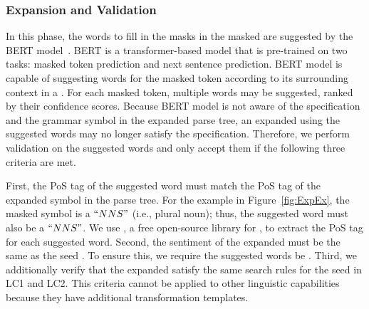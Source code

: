 \subsubsection{\Sent Expansion and Validation}

In this phase, the words to fill in the masks in the masked \sents are
suggested by the BERT model~\cite{devlin2019bert}. 
BERT is a transformer-based \nl model that is pre-trained on two tasks: masked token prediction and next sentence prediction. BERT model is capable of suggesting words for the masked
token according to its surrounding context in a \sent. For each masked
token, multiple words may be suggested, ranked by their confidence scores.
%
Because BERT model is not aware of the \lc
specification and the grammar symbol in the expanded parse tree, an
expanded \sent using the suggested words may no longer satisfy the
\lc specification. Therefore, we perform validation
on the suggested words and only accept them if the following three
criteria are met.

First, the PoS tag of the suggested word must match the PoS tag of the
expanded symbol in the parse tree. For the example in
Figure~\ref{fig:ExpEx}, the masked symbol is a $``NNS"$ (i.e., plural
noun); thus, the suggested word must also be a $``NNS"$. We use \spacy \cite{spacy}, a free open-source library for \nlp, to extract the PoS
tag for each suggested word.
Second, the
sentiment of the expanded \sent must be the same as the seed \sent. To
ensure this, we require the suggested words be \neu. 
Third, we additionally verify that the
expanded \sents satisfy the same search rules for the seed
\sents in LC1 and LC2. This criteria cannot be applied to other linguistic capabilities because they have additional transformation templates.



